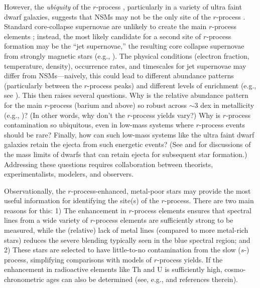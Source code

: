 \documentclass[preprint]{aastex61}
\begin{document}
However, the {\it ubiquity} of the $r$-process \citep{Roederer2010},
particularly in a variety of ultra faint dwarf galaxies, suggests that
NSMs may not be the only site of the $r$-process
\citep{TsujimotoNishimura2015,Tsujimoto2017}.  Standard core-collapse
supernovae are unlikely to create the main $r$-process elements
\citep{ArconesThielemann2013}; instead, the most likely
candidate for a second site of $r$-process formation may be the ``jet
supernovae,'' the resulting core collapse supernovae from strongly
magnetic stars (e.g., \citealt{Winteler2012,Cescutti2015}).  The physical
conditions (electron fraction, temperature, density), occurrence
rates, and timescales for jet supernovae may differ from
NSMs---naively, this could lead to different abundance patterns
(particularly between the $r$-process peaks) and different levels of
enrichment (e.g., see \citealt{Mosta2017}).  This then raises several
questions. Why is the relative abundance pattern for the main
$r$-process (barium and above) so robust across $\sim 3$ dex in
metallicity (e.g., \citealt{Sakari2018})? (In other words, why don't
the $r$-process yields vary?) Why is $r$-process contamination so
ubiquitous, even in low-mass systems where $r$-process events should
be rare? Finally, how can such low-mass systems like the ultra faint
dwarf galaxies retain the ejecta from such energetic events? (See
\citealt{BlandHawthorn2015} and \citealt{Beniamini2018} for
discussions of the mass limits of dwarfs that can retain ejecta for
subsequent star formation.) Addressing these questions requires
collaboration between theorists, experimentalists, modelers, and
observers.

Observationally, the $r$-process-enhanced, metal-poor stars may
provide the most useful information for identifying the site(s) of the 
$r$-process.  There are two main reasons for this:  1) The enhancement
in $r$-process elements ensures that spectral lines from a wide
variety of $r$-process elements are sufficiently strong to be
measured, while the (relative) lack of metal lines (compared to more
metal-rich stars) reduces the severe blending typically seen in the
blue spectral region; and 2) These stars are selected to have
little-to-no contamination from the slow ($s$-) process, simplifying
comparisons with models of $r$-process yields. If the enhancement in
radioactive elements like Th and U is sufficiently high,
cosmo-chronometric ages can also be determined (see, e.g.,
\citealt{Holmbeck2018} and references therein).
\end{document}
